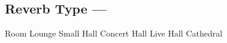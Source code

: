 \subsection[Reverb Type]{Reverb Type --- \UiKey{\SET}}









































Room
Lounge
Small Hall
Concert Hall
Live Hall
Cathedral
